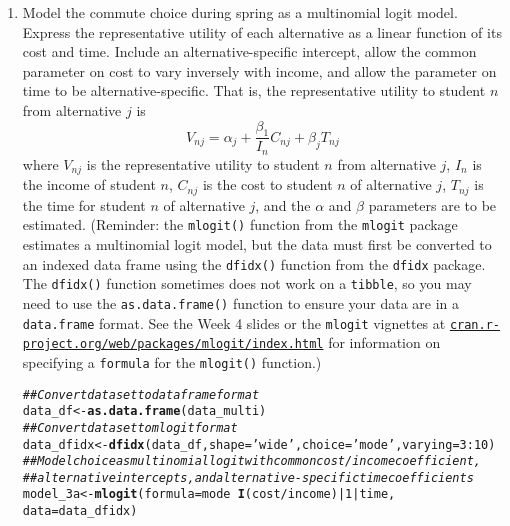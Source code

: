 \documentclass[11pt,letterpaper]{article}\usepackage[]{graphicx}\usepackage[]{color}
\makeatletter
\newcommand{\hlnum}[1]{\textcolor[rgb]{0.686,0.059,0.569}{#1}}%
\newcommand{\hlstr}[1]{\textcolor[rgb]{0.192,0.494,0.8}{#1}}%
\newcommand{\hlcom}[1]{\textcolor[rgb]{0.678,0.584,0.686}{\textit{#1}}}%
\newcommand{\hlopt}[1]{\textcolor[rgb]{0,0,0}{#1}}%
\newcommand{\hlstd}[1]{\textcolor[rgb]{0.345,0.345,0.345}{#1}}%
\newcommand{\hlkwb}[1]{\textcolor[rgb]{0.69,0.353,0.396}{#1}}%
\newcommand{\hlkwc}[1]{\textcolor[rgb]{0.333,0.667,0.333}{#1}}%
\newcommand{\hlkwd}[1]{\textcolor[rgb]{0.737,0.353,0.396}{\textbf{#1}}}%
\newenvironment{kframe}{%
 \def\at@end@of@kframe{}%
 \ifinner\ifhmode%
  \def\at@end@of@kframe{\end{minipage}}%
  \begin{minipage}{\columnwidth}%
 \fi\fi%
 \def\FrameCommand##1{\hskip\@totalleftmargin \hskip-\fboxsep
 \colorbox{shadecolor}{##1}\hskip-\fboxsep
     \hskip-\linewidth \hskip-\@totalleftmargin \hskip\columnwidth}%
 \MakeFramed {\advance\hsize-\width
   \@totalleftmargin\z@ \linewidth\hsize
   \@setminipage}}%
 {\par\unskip\endMakeFramed%
 \at@end@of@kframe}
\newenvironment{knitrout}{}{} %
\makeatother
\begin{document}
\begin{enumerate}[label=\alph*., leftmargin=*]
	\item Model the commute choice during spring as a multinomial logit model. Express the representative utility of each alternative as a linear function of its cost and time. Include an alternative-specific intercept, allow the common parameter on cost to vary inversely with income, and allow the parameter on time to be alternative-specific. That is, the representative utility to student $n$ from alternative $j$ is
	$$V_{nj} = \alpha_j + \frac{\beta_1}{I_n} C_{nj} + \beta_j T_{nj}$$
	where $V_{nj}$ is the representative utility to student $n$ from alternative $j$, $I_n$ is the income of student $n$, $C_{nj}$ is the cost to student $n$ of alternative $j$, $T_{nj}$ is the time for student $n$ of alternative $j$, and the $\alpha$ and $\beta$ parameters are to be estimated. (Reminder: the \texttt{mlogit()} function from the \texttt{mlogit} package estimates a multinomial logit model, but the data must first be converted to an indexed data frame using the \texttt{dfidx()} function from the \texttt{dfidx} package. The \texttt{dfidx()} function sometimes does not work on a \texttt{tibble}, so you may need to use the \texttt{as.data.frame()} function to ensure your data are in a \texttt{data.frame} format. See the Week 4 slides or the \texttt{mlogit} vignettes at \href{https://cran.r-project.org/web/packages/mlogit/index.html}{\texttt{cran.r-project.org/web/packages/mlogit/index.html}} for information on specifying a \texttt{formula} for the \texttt{mlogit()} function.)

\begin{knitrout}
\color{fgcolor}\begin{kframe}
\begin{alltt}
\hlcom{## Convert dataset to data frame format}
\hlstd{data_df} \hlkwb{<-} \hlkwd{as.data.frame}\hlstd{(data_multi)}
\hlcom{## Convert dataset to mlogit format}
\hlstd{data_dfidx} \hlkwb{<-} \hlkwd{dfidx}\hlstd{(data_df,} \hlkwc{shape} \hlstd{=} \hlstr{'wide'}\hlstd{,} \hlkwc{choice} \hlstd{=} \hlstr{'mode'}\hlstd{,} \hlkwc{varying} \hlstd{=} \hlnum{3}\hlopt{:}\hlnum{10}\hlstd{)}
\hlcom{## Model choice as multinomial logit with common cost/income coefficient, }
\hlcom{## alternative intercepts, and alternative-specific time coefficients}
\hlstd{model_3a} \hlkwb{<-} \hlkwd{mlogit}\hlstd{(}\hlkwc{formula} \hlstd{= mode} \hlopt{~} \hlkwd{I}\hlstd{(cost} \hlopt{/} \hlstd{income)} \hlopt{|} \hlnum{1} \hlopt{|} \hlstd{time,}
                   \hlkwc{data} \hlstd{= data_dfidx)}
\end{alltt}
\end{kframe}
\end{knitrout}


\end{enumerate}
\end{document}
